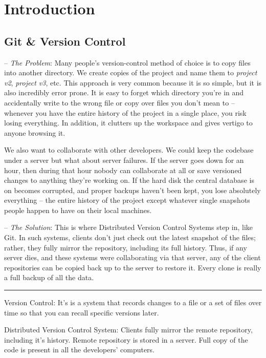 \documentclass[12pt,a4]{article}
\begin{document}


\section{Introduction}
\subsection{Git \& Version Control}
{\sf -- \emph{The Problem}:}
Many people’s version-control method of choice is to copy files into another
directory. We create copies of the project and name them to \emph{project v2},
\emph{project v3}, etc. This approach is very common because it is so simple,
but it is also incredibly error prone. It is easy to forget which directory
you’re in and accidentally write to the wrong file or copy over files you don’t
mean to -- whenever you have the entire history of the project in a single
place, you risk losing everything. In addition, it clutters up the workspace and
gives vertigo to anyone browsing it.

We also want to collaborate with other developers. We could keep the codebase
under a server but what about server failures. If the server goes down for an
hour, then during that hour nobody can collaborate at all or save versioned
changes to anything they're working on. If the hard disk the central database is
on becomes corrupted, and proper backups haven’t been kept, you lose absolutely
everything -- the entire history of the project except whatever single snapshots
people happen to have on their local machines.

{\sf -- \emph{The Solution}:} This is where Distributed Version Control Systems
step in, like Git. In such systems, clients don’t just check out the latest
snapshot of the files; rather, they fully mirror the repository, including its
full history. Thus, if any server dies, and these systems were collaborating via
that server, any of the client repositories can be copied back up to the server
to restore it. Every clone is really a full backup of all the data.

\textcolor[RGB]{220,220,220}{\rule{\linewidth}{0.8pt}}

{\sf Version Control:} It's is a system that records changes to a file or a set
of files over time so that you can recall specific versions later.

{\sf Distributed Version Control System:} Clients fully mirror the remote
repository, including it's history. Remote repository is stored in a server.
Full copy of the code is present in all the developers' computers.
\end{document}
